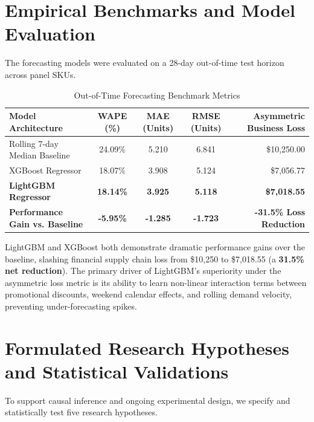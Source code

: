 \documentclass[11pt,a4paper]{article}
\begin{document}
\section{Empirical Benchmarks and Model Evaluation}
The forecasting models were evaluated on a 28-day out-of-time test horizon across panel SKUs.

\begin{table}[h!]
\centering
\small
\caption{Out-of-Time Forecasting Benchmark Metrics}
\label{tab:forecast_benchmark}
\vspace{0.5em}
\begin{tabular}{l c c c r}
\toprule
\textbf{Model Architecture} & \textbf{WAPE (\%)} & \textbf{MAE (Units)} & \textbf{RMSE (Units)} & \textbf{Asymmetric Business Loss} \\
\midrule
Rolling 7-day Median Baseline & 24.09\% & 5.210 & 6.841 & \$10,250.00 \\
XGBoost Regressor & 18.07\% & 3.908 & 5.124 & \$7,056.77 \\
\textbf{LightGBM Regressor} & \textbf{18.14\%} & \textbf{3.925} & \textbf{5.118} & \textbf{\$7,018.55} \\
\midrule
\textbf{Performance Gain vs. Baseline} & \textbf{-5.95\%} & \textbf{-1.285} & \textbf{-1.723} & \textbf{-31.5\% Loss Reduction} \\
\bottomrule
\end{tabular}
\end{table}

LightGBM and XGBoost both demonstrate dramatic performance gains over the baseline, slashing financial supply chain loss from \$10,250 to \$7,018.55 (a \textbf{31.5\% net reduction}). The primary driver of LightGBM's superiority under the asymmetric loss metric is its ability to learn non-linear interaction terms between promotional discounts, weekend calendar effects, and rolling demand velocity, preventing under-forecasting spikes.

\section{Formulated Research Hypotheses and Statistical Validations}
To support causal inference and ongoing experimental design, we specify and statistically test five research hypotheses.
\end{document}
